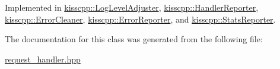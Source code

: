 Implemented in \hyperlink{classkisscpp_1_1_log_level_adjuster_a971d59364d21bbaa283ea520caefa604}{kisscpp\-::\-Log\-Level\-Adjuster}, \hyperlink{classkisscpp_1_1_handler_reporter_a5085be2e4dcfa1e98bf517c8d0b5443f}{kisscpp\-::\-Handler\-Reporter}, \hyperlink{classkisscpp_1_1_error_cleaner_a0a55baa8cd22124b7a0900fd55e24a96}{kisscpp\-::\-Error\-Cleaner}, \hyperlink{classkisscpp_1_1_error_reporter_a7afc458c0a447f93f138f006acb57117}{kisscpp\-::\-Error\-Reporter}, and \hyperlink{classkisscpp_1_1_stats_reporter_af57d8c01b118a4693b8b226c3f9dbbe5}{kisscpp\-::\-Stats\-Reporter}.



The documentation for this class was generated from the following file\-:\begin{DoxyCompactItemize}
\item 
\hyperlink{request__handler_8hpp}{request\-\_\-handler.\-hpp}\end{DoxyCompactItemize}
